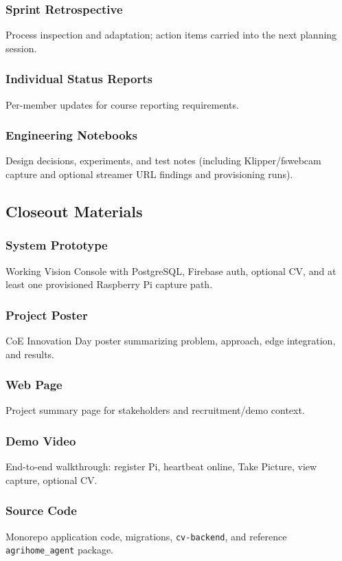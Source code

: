 \documentclass[11pt,letterpaper]{article}
\begin{document}
\subsubsection{Sprint Retrospective}
Process inspection and adaptation; action items carried into the next planning session.

\subsubsection{Individual Status Reports}
Per-member updates for course reporting requirements.

\subsubsection{Engineering Notebooks}
Design decisions, experiments, and test notes (including Klipper/fswebcam capture and optional streamer URL findings and
provisioning runs).

\subsection{Closeout Materials}
\subsubsection{System Prototype}
Working Vision Console with PostgreSQL, Firebase auth, optional CV, and at least one provisioned
Raspberry Pi capture path.

\subsubsection{Project Poster}
CoE Innovation Day poster summarizing problem, approach, edge integration, and results.

\subsubsection{Web Page}
Project summary page for stakeholders and recruitment/demo context.

\subsubsection{Demo Video}
End-to-end walkthrough: register Pi, heartbeat online, Take Picture, view capture, optional CV.

\subsubsection{Source Code}
Monorepo application code, migrations, \texttt{cv-backend}, and reference \texttt{agrihome\_agent} package.
\end{document}
